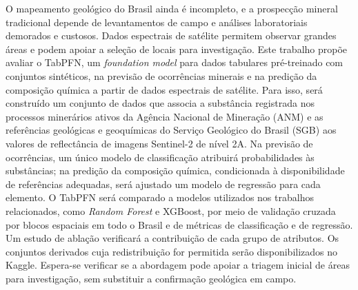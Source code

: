 \begin{resumo}
O mapeamento geológico do Brasil ainda é incompleto, e a prospecção mineral tradicional depende de levantamentos de campo e análises laboratoriais demorados e custosos. Dados espectrais de satélite permitem observar grandes áreas e podem apoiar a seleção de locais para investigação. Este trabalho propõe avaliar o TabPFN, um \textit{foundation model} para dados tabulares pré-treinado com conjuntos sintéticos, na previsão de ocorrências minerais e na predição da composição química a partir de dados espectrais de satélite. Para isso, será construído um conjunto de dados que associa a substância registrada nos processos minerários ativos da Agência Nacional de Mineração (ANM) e as referências geológicas e geoquímicas do Serviço Geológico do Brasil (SGB) aos valores de reflectância de imagens Sentinel-2 de nível 2A. Na previsão de ocorrências, um único modelo de classificação atribuirá probabilidades às substâncias; na predição da composição química, condicionada à disponibilidade de referências adequadas, será ajustado um modelo de regressão para cada elemento. O TabPFN será comparado a modelos utilizados nos trabalhos relacionados, como \textit{Random Forest} e XGBoost, por meio de validação cruzada por blocos espaciais em todo o Brasil e de métricas de classificação e de regressão. Um estudo de ablação verificará a contribuição de cada grupo de atributos. Os conjuntos derivados cuja redistribuição for permitida serão disponibilizados no Kaggle. Espera-se verificar se a abordagem pode apoiar a triagem inicial de áreas para investigação, sem substituir a confirmação geológica em campo.
\end{resumo}
